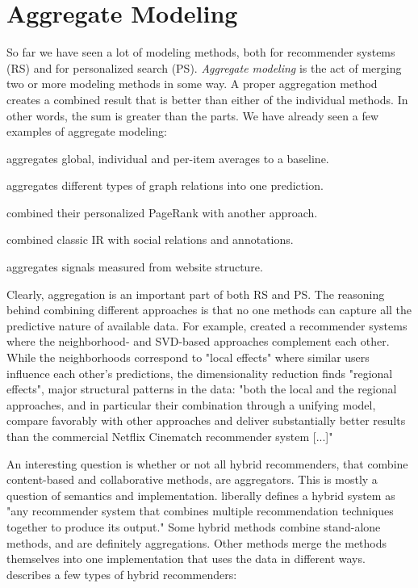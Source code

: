 \section{Aggregate Modeling}
\label{sec:aggregate}

So far we have seen a lot of modeling methods, both for recommender systems (RS) and for personalized search (PS).
\emph{Aggregate modeling} is the act of merging two or more modeling methods in some way.
A proper aggregation method creates a combined result that is better than either of the individual methods.
In other words, the sum is greater than the parts.
We have already seen a few examples of aggregate modeling:

\begin{itemize*}
  \item \cite{Koren2008} aggregates global, individual and per-item averages to a baseline.
  \item \cite{Huang2002} aggregates different types of graph relations into one prediction.
  \item \citet{Haveliwala2003} combined their personalized PageRank with another approach.
  \item \cite{Carmel2009} combined classic IR with social relations and annotations.
  \item \citet[p5]{Bender2005} aggregates signals measured from website structure.
\end{itemize*}

Clearly, aggregation is an important part of both RS and PS.
The reasoning behind combining different approaches is that no one methods
can capture all the predictive nature of available data.
For example, 
\cite{Bell2007b} created a recommender systems where the neighborhood- and SVD-based approaches complement each other.
While the neighborhoods correspond to "local effects" where similar users influence each other's predictions,
the dimensionality reduction finds "regional effects", major structural patterns in the data: 
"both the local and the regional approaches, and in particular their combination through a unifying model, 
compare favorably with other approaches and deliver substantially better results than the 
commercial Netflix Cinematch recommender system [...]"
\cite[p1]{Bell2007b}

An interesting question is whether or not all hybrid recommenders,
that combine content-based and collaborative methods, are aggregators. 
This is mostly a question of semantics and implementation.
\citet[p4]{Burke2007} liberally defines a hybrid system as 
"any recommender system that combines multiple recommendation techniques together to produce its output."
Some hybrid methods combine stand-alone methods, and are definitely aggregations.
Other methods merge the methods themselves into one implementation that uses the data in different ways.
\citeauthor{Burke2007} describes a few types of hybrid recommenders:

